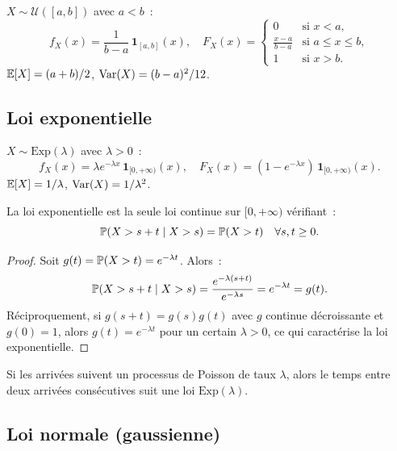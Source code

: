 \begin{definition}
$X \sim \mathcal{U}([a,b])$ avec $a < b$~:
\[
    f_X(x) = \frac{1}{b-a}\, \mathbf{1}_{[a,b]}(x), \quad
    F_X(x) = \begin{cases} 0 & \text{si } x < a, \\ \frac{x-a}{b-a} & \text{si } a \leq x \leq b, \\ 1 & \text{si } x > b. \end{cases}
\]
$\mathbb{E}[X] = (a+b)/2$, $\mathrm{Var}(X) = (b-a)^2/12$.
\end{definition}

\subsection{Loi exponentielle}

\begin{definition}[Exponentielle]
$X \sim \text{Exp}(\lambda)$ avec $\lambda > 0$~:
\[
    f_X(x) = \lambda e^{-\lambda x}\, \mathbf{1}_{[0,+\infty)}(x), \quad
    F_X(x) = (1 - e^{-\lambda x})\, \mathbf{1}_{[0,+\infty)}(x).
\]
$\mathbb{E}[X] = 1/\lambda$, $\mathrm{Var}(X) = 1/\lambda^2$.
\end{definition}

\begin{theoreme}
La loi exponentielle est la seule loi continue sur $[0,+\infty)$ v\'erifiant~:
\[
    \mathbb{P}(X > s + t \mid X > s) = \mathbb{P}(X > t) \quad \forall s, t \geq 0.
\]
\end{theoreme}

\begin{proof}
Soit $g(t) = \mathbb{P}(X > t) = e^{-\lambda t}$. Alors~:
\[
    \mathbb{P}(X > s+t \mid X > s) = \frac{e^{-\lambda(s+t)}}{e^{-\lambda s}} = e^{-\lambda t} = g(t).
\]
R\'eciproquement, si $g(s+t) = g(s)g(t)$ avec $g$ continue d\'ecroissante et $g(0)=1$,
alors $g(t) = e^{-\lambda t}$ pour un certain $\lambda > 0$, ce qui caract\'erise
la loi exponentielle.
\end{proof}

\begin{intuition}[title=\textbf{Exponentielle et Poisson}]
Si les arriv\'ees suivent un processus de Poisson de taux $\lambda$, alors le temps
entre deux arriv\'ees cons\'ecutives suit une loi $\text{Exp}(\lambda)$.
\end{intuition}

\subsection{Loi normale (gaussienne)}

